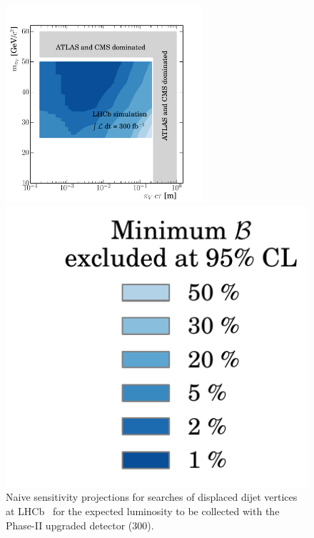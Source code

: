 
\begin{figure}[t]
  \includegraphics[width=0.65\textwidth]{figures/LLP_compare_PIV_4_HL.pdf}
  \begin{minipage}[t]{0.26\textwidth}
  \vspace{-6.cm}
  \hspace{-0.7cm}
  \includegraphics[width=1.2\textwidth]{figures/LLP_compare_legend.pdf}
  \end{minipage}
  \caption{Naive sensitivity projections for searches of displaced dijet vertices at LHCb~\cite{Aaij:2017mic} for the expected luminosity to be collected with the Phase-II upgraded detector (300\invfb). %
}
  \label{fig:dvsearches_hllhc}
\end{figure}

